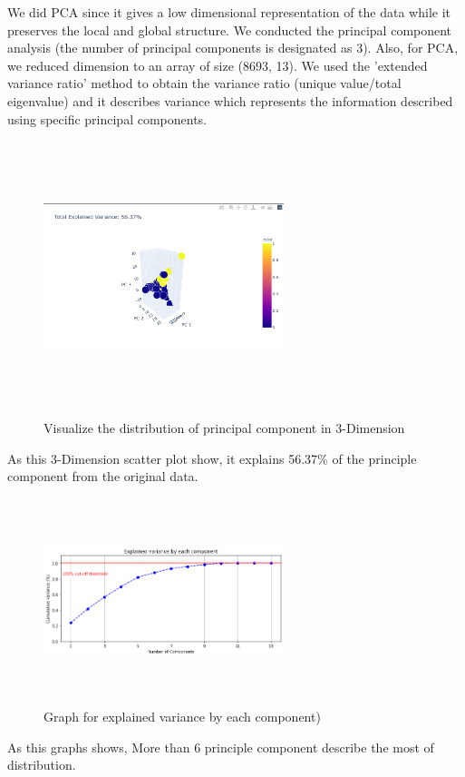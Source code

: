 \documentclass[fleqn,10pt]{SelfArx} %
\begin{document}
We did PCA since it gives a low dimensional representation of the data while it preserves the local and global structure. We conducted the principal component analysis (the number of principal components is designated as 3). Also, for PCA, we reduced dimension to an array of size (8693, 13). We used the 'extended variance ratio' method to obtain the variance ratio (unique value/total eigenvalue) and it describes variance which represents the information described using specific principal components.
\begin{figure}[H]
    \centering
    \includegraphics[width=7cm, height=8cm]{img/pca.png}
    \caption{Visualize the distribution of principal component in 3-Dimension}
    \label{fig:my_label}
\end{figure}
As this 3-Dimension scatter plot show, it explains 56.37\% of the principle component from the original data. 
\begin{figure}[H]
    \centering
    \includegraphics[width=7cm, height=6cm]{img/PCA2.png}
    \caption{Graph for explained variance by each component)}
    \label{fig:my_label}
\end{figure}
As this graphs shows, More than 6 principle component describe the most of distribution.
\end{document}
